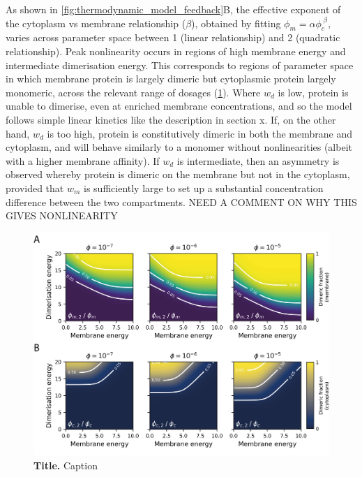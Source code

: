 \documentclass[12pt]{"article"}
\newcommand{\mycaption}[2]{\caption[#1]{\textbf{#1.} #2}}
\begin{document}
As shown in \cref{fig:thermodynamic_model_feedback}B, the effective exponent of the cytoplasm vs membrane relationship ($\beta$), obtained by fitting $\phi_m = \alpha \phi_c^{\;\beta}$, varies across parameter space between 1 (linear relationship) and 2 (quadratic relationship). Peak nonlinearity occurs in regions of high membrane energy and intermediate dimerisation energy. This corresponds to regions of parameter space in which membrane protein is largely dimeric but cytoplasmic protein largely monomeric, across the relevant range of dosages (\cref{fig:thermodynamic_model_dimer_fractions}). Where $w_d$ is low, protein is unable to dimerise, even at enriched membrane concentrations, and so the model follows simple linear kinetics like the description in section x. If, on the other hand, $w_d$ is too high, protein is constitutively dimeric in both the membrane and cytoplasm, and will behave similarly to a monomer without nonlinearities (albeit with a higher membrane affinity). If $w_d$ is intermediate, then an asymmetry is observed whereby protein is dimeric on the membrane but not in the cytoplasm, provided that $w_m$ is sufficiently large to set up a substantial concentration difference between the two compartments. NEED A COMMENT ON WHY THIS GIVES NONLINEARITY\\

\begin{figure}[!h]
\includegraphics[scale=0.9]{thermodynamic_model_dimer_fractions}
\setlength{\abovecaptionskip}{20pt}
\centering
\mycaption{Title}{Caption}
\label{fig:thermodynamic_model_dimer_fractions}
\end{figure}
\end{document}
